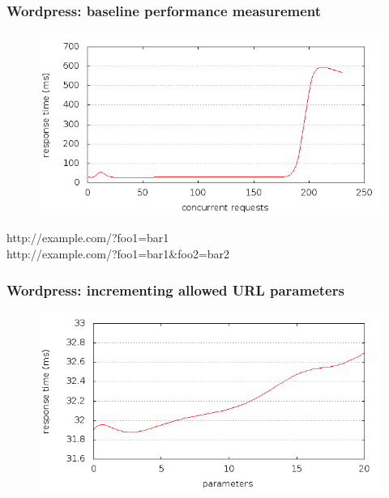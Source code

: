 \begin{frame}
  \frametitle{Wordpress: baseline performance measurement}
  \begin{figure}[H]
  \centering
  \includegraphics[scale=0.5] {../paper/images/results/baseline_wp/output.png}
  \end{figure}
\end{frame}

\begin{frame}
  \mbox{http://example.com/?foo1=bar1}\\
  \mbox{http://example.com/?foo1=bar1\&foo2=bar2}

  \frametitle{Wordpress: incrementing allowed URL parameters}
  \begin{figure}[H]
  \centering
  \includegraphics[scale=0.5] {../paper/images/results/wp_with_naxsi_incremented_allowed_parameters/output.png}
  \end{figure}
\end{frame}  
  
